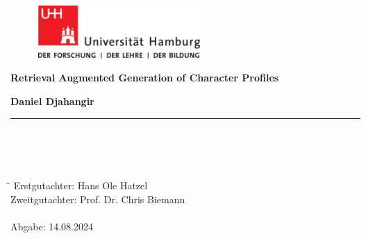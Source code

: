 \begin{titlepage}

  \setcounter{page}{-1}

	\begin{figure}[h]
		\begin{minipage}[b]{62mm}
			\includegraphics[width=62mm]{ressources/images/unilogo.png}
		\end{minipage}
		\hspace{4cm}
	\end{figure}

	\vfill
	
	\begin{center}
		\vspace{14mm}
		\noindent \textbf{\huge
		  Retrieval Augmented Generation of Character Profiles
		}
		\vspace{60mm}	
	\end{center}
	
	\vfill
	
	\noindent \textbf{Daniel Djahangir} \\
	\noindent \rule{\textwidth}{0.4mm} 
	 \\
	 \\
	 \\
	\begin{tabbing}
	\hspace{8em} \=  \kill
	Erstgutachter: \> Hans Ole Hatzel \\
	Zweitgutachter: \> Prof. Dr. Chris Biemann \\
	~ \\
	Abgabe: 14.08.2024
	\end{tabbing}
	
	\newpage 
	\thispagestyle{empty}
	\setcounter{page}{0}

\end{titlepage}

